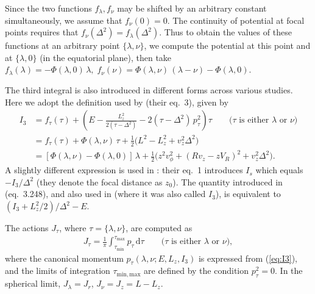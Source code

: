\documentclass[12pt]{article}
\renewcommand{\d}{\mathrm{d}}
\begin{document}
Since the two functions $f_\lambda,f_\nu$ may be shifted by an arbitrary constant simultaneously, we assume that $f_\nu(0)=0$. The continuity of potential at focal points requires that $f_\nu(\Delta^2)=f_\lambda(\Delta^2)$. Thus to obtain the values of these functions at an arbitrary point $\{\lambda,\nu\}$, we compute the potential at this point and at $\{\lambda,0\}$ (in the equatorial plane), then take $f_\lambda(\lambda) = -\Phi(\lambda,0)\,\lambda,\; f_\nu(\nu) = \Phi(\lambda,\nu)\,(\lambda-\nu) - \Phi(\lambda,0)$.

The third integral is also introduced in different forms across various studies.
Here we adopt the definition used by \cite{Sanders2012} (their eq.~3), given by
\begin{subequations}
\begin{align}
I_3 &= f_\tau(\tau) + \left( E - \frac{L_z^2}{2(\tau-\Delta^2)} - 2(\tau-\Delta^2)\,p_\tau^2 \right) \tau \qquad\mbox{($\tau$ is either $\lambda$ or $\nu$)}  \label{eq:I3} \\
&= f_\tau(\tau) + \Phi(\lambda,\nu)\,\tau +
\tfrac 1 2 \big( L^2 - L_z^2 + v_z^2\Delta^2 \big) \nonumber \\
&= [\Phi(\lambda,\nu) - \Phi(\lambda,0)]\,\lambda +
\tfrac 1 2 \big( z^2 v_\phi^2 + (R v_z - z V_R)^2 + v_z^2\Delta^2 \big) . \label{eq:I3init}
\end{align}
\end{subequations}
A slightly different expression is used in \cite{Bienayme2015}: their eq.~1 introduces $I_s$ which equals $-I_3/\Delta^2$ (they denote the focal distance as $z_0$). 
The quantity introduced in \cite{BinneyTremaine} (eq.~3.248), and also used in \cite{Binney2012} (where it was also called $I_3$), is equivalent to $(I_3 + L_z^2/2) / \Delta^2 - E$.

The actions $J_\tau$, where $\tau=\{\lambda,\nu\}$, are computed as
\begin{align}  \label{eq:ActionsStaeckel}
J_\tau = \frac{1}{\pi} \int_{\tau_\mathrm{min}}^{\tau_\mathrm{max}} p_\tau\,\d \tau
\qquad\mbox{($\tau$ is either $\lambda$ or $\nu$)},
\end{align}
where the canonical momentum $p_\tau(\lambda,\nu;E,L_z,I_3)$ is expressed from (\ref{eq:I3}), and the limits of integration $\tau_\mathrm{min,max}$ are defined by the condition $p_\tau^2=0$. In the spherical limit, $J_\lambda = J_r$, $J_\nu = J_z = L-L_z$.
\end{document}
